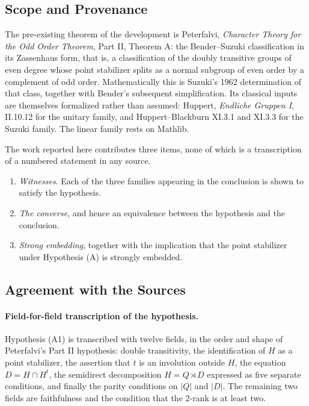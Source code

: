 \documentclass{article}
\begin{document}
\subsection{Scope and Provenance}
\label{sec:provenance}

The pre-existing theorem of the development is Peterfalvi, \emph{Character
Theory for the Odd Order Theorem}, Part II, Theorem A: the Bender--Suzuki
classification in its Zassenhaus form, that is, a classification of the doubly
transitive groups of even degree whose point stabilizer splits as a normal
subgroup of even order by a complement of odd order. Mathematically this is
Suzuki's 1962 determination of that class, together with Bender's subsequent
simplification. Its classical inputs are themselves formalized rather than
assumed: Huppert, \emph{Endliche Gruppen I}, II.10.12 for the unitary family,
and Huppert--Blackburn XI.3.1 and XI.3.3 for the Suzuki family. The linear
family rests on Mathlib.

The work reported here contributes three items, none of which is a transcription
of a numbered statement in any source.
\begin{enumerate}
  \item \emph{Witnesses}. Each of the three families appearing in the conclusion
  is shown to satisfy the hypothesis.
  \item \emph{The converse}, and hence an equivalence between the hypothesis and
  the conclusion.
  \item \emph{Strong embedding}, together with the implication that the point
  stabilizer under Hypothesis (A) is strongly embedded.
\end{enumerate}

\subsection{Agreement with the Sources}
\label{sec:agreement}

\paragraph{Field-for-field transcription of the hypothesis.}
Hypothesis (A1) is transcribed with twelve fields, in the order and shape of
Peterfalvi's Part II hypothesis: double transitivity, the identification of
\(H\) as a point stabilizer, the assertion that \(t\) is an involution outside
\(H\), the equation \(D=H\cap H^t\), the semidirect decomposition \(H=Q\rtimes D\)
expressed as five separate conditions, and finally the parity conditions on
\(\lvert Q\rvert\) and \(\lvert D\rvert\). The remaining two fields are
faithfulness and the condition that the \(2\)-rank is at least two.
\end{document}
